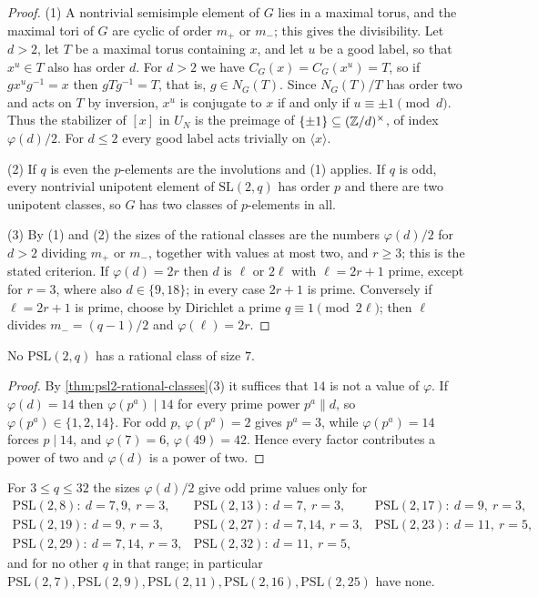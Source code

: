 \begin{proof}
(1)  A nontrivial semisimple element of \(G\) lies in a maximal torus, and the
maximal tori of \(G\) are cyclic of order \(m_+\) or \(m_-\); this gives the
divisibility.  Let \(d>2\), let \(T\) be a maximal torus containing \(x\), and
let \(u\) be a good label, so that \(x^u\in T\) also has order \(d\).  For
\(d>2\) we have \(C_G(x)=C_G(x^u)=T\), so if \(gx^ug^{-1}=x\) then
\(gTg^{-1}=T\), that is, \(g\in N_G(T)\).  Since
\(N_G(T)/T\) has order two and acts on \(T\) by inversion, \(x^u\) is
conjugate to \(x\) if and only if \(u\equiv\pm1\pmod d\).  Thus the stabilizer
of \([x]\) in \(U_N\) is the preimage of \(\{\pm1\}\subseteq(\mathbb Z/d)^\times\),
of index \(\varphi(d)/2\).  For \(d\leq2\) every good label acts trivially on
\(\langle x\rangle\).

(2)  If \(q\) is even the \(p\)-elements are the involutions and (1) applies.
If \(q\) is odd, every nontrivial unipotent element of \(\mathrm{SL}(2,q)\)
has order \(p\) and there are two unipotent classes, so \(G\) has two
classes of \(p\)-elements in all.

(3)  By (1) and (2) the sizes of the rational classes are the numbers
\(\varphi(d)/2\) for \(d>2\) dividing \(m_+\) or \(m_-\), together with
values at most two, and \(r\geq3\); this is the stated criterion.  If
\(\varphi(d)=2r\) then \(d\) is \(\ell\) or \(2\ell\) with \(\ell=2r+1\)
prime, except for \(r=3\), where also \(d\in\{9,18\}\); in every case \(2r+1\)
is prime.  Conversely if \(\ell=2r+1\) is prime, choose by Dirichlet a prime
\(q\equiv1\pmod{2\ell}\); then \(\ell\) divides \(m_-=(q-1)/2\) and
\(\varphi(\ell)=2r\).
\end{proof}

\begin{corollary}
\label{cor:psl2-no-seven}
No \(\mathrm{PSL}(2,q)\) has a rational class of size \(7\).
\end{corollary}

\begin{proof}
By \cref{thm:psl2-rational-classes}(3) it suffices that \(14\) is not a value
of \(\varphi\).  If \(\varphi(d)=14\) then \(\varphi(p^a)\mid14\) for every
prime power \(p^a\|d\), so \(\varphi(p^a)\in\{1,2,14\}\).  For odd \(p\),
\(\varphi(p^a)=2\) gives \(p^a=3\), while \(\varphi(p^a)=14\) forces
\(p\mid14\), and \(\varphi(7)=6\), \(\varphi(49)=42\).  Hence every factor
contributes a power of two and \(\varphi(d)\) is a power of two.
\end{proof}

For \(3\leq q\leq32\) the sizes \(\varphi(d)/2\) give odd prime values only
for
\[
 \begin{array}{lll}
 \mathrm{PSL}(2,8):\ d=7,9,\ r=3, &
 \mathrm{PSL}(2,13):\ d=7,\ r=3, &
 \mathrm{PSL}(2,17):\ d=9,\ r=3,\\
 \mathrm{PSL}(2,19):\ d=9,\ r=3, &
 \mathrm{PSL}(2,27):\ d=7,14,\ r=3, &
 \mathrm{PSL}(2,23):\ d=11,\ r=5,\\
 \mathrm{PSL}(2,29):\ d=7,14,\ r=3, &
 \mathrm{PSL}(2,32):\ d=11,\ r=5, &
 \end{array}
\]
and for no other \(q\) in that range; in particular
\(\mathrm{PSL}(2,7),\mathrm{PSL}(2,9),\mathrm{PSL}(2,11),\mathrm{PSL}(2,16),
\mathrm{PSL}(2,25)\) have none.


